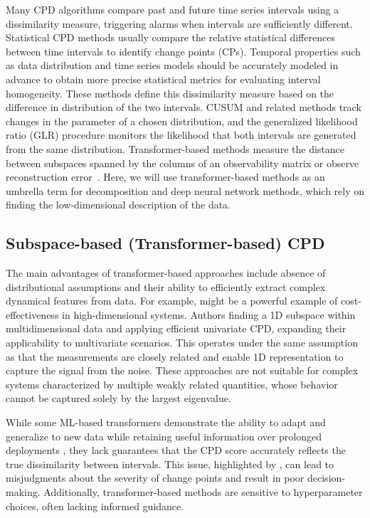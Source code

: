 
Many CPD algorithms compare past and future time series intervals using a dissimilarity measure, triggering alarms when intervals are sufficiently different. Statistical CPD methods usually compare the relative statistical differences between time intervals to identify change points (CPs). Temporal properties such as data distribution and time series models should be accurately modeled in advance to obtain more precise statistical metrics for evaluating interval homogeneity. These methods define this dissimilarity measure based on the difference in distribution of the two intervals. CUSUM and related methods \citet{Ye2023} track changes in the parameter of a chosen distribution, and the generalized likelihood ratio (GLR) procedure \citet{Xie2013, Korycki2021} monitors the likelihood that both intervals are generated from the same distribution. Transformer-based methods measure the distance between subspaces spanned by the columns of an observability matrix \citet{Moskvina2003, Kawahara2007} or observe reconstruction error~\citep{DeRyck2021, Bao2024}. Here, we will use transformer-based methods as an umbrella term for decomposition and deep neural network methods, which rely on finding the low-dimensional description of the data.  %

\subsection{Subspace-based (Transformer-based) CPD}
The main advantages of transformer-based approaches include absence of distributional assumptions and their ability to efficiently extract complex dynamical features from data. For example, \citet{Hirabaru2016} might be a powerful example of cost-effectiveness in high-dimensional systems. Authors finding a 1D subspace within multidimensional data and applying efficient univariate CPD, expanding their applicability to multivariate scenarios. This operates under the same assumption as \citet{Fathy2019} that the measurements are closely related and enable 1D representation to capture the signal from the noise. These approaches are not suitable for complex systems characterized by multiple weakly related quantities, whose behavior cannot be captured solely by the largest eigenvalue.

While some ML-based transformers demonstrate the ability to adapt and generalize to new data while retaining useful information over prolonged deployments \citep{Corizzo2022}, they lack guarantees that the CPD score accurately reflects the true dissimilarity between intervals. This issue, highlighted by \citet{DeRyck2021}, can lead to misjudgments about the severity of change points and result in poor decision-making. Additionally, transformer-based methods are sensitive to hyperparameter choices, often lacking informed guidance.

